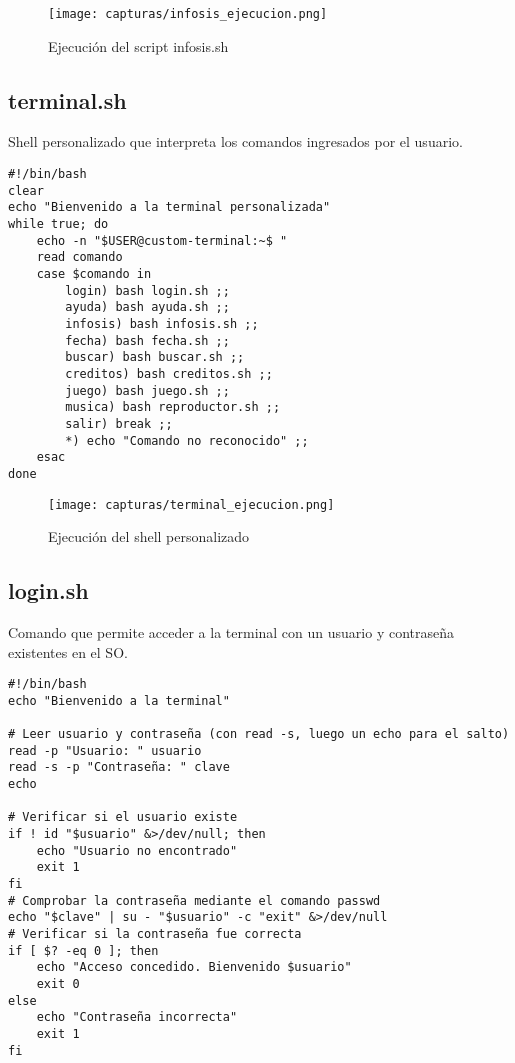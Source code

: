 \documentclass[12pt]{article}
\begin{document}
\begin{figure}[H]
    \centering
    \texttt{[image: capturas/infosis\_ejecucion.png]}
    \caption{Ejecución del script infosis.sh}
\end{figure}

\subsection{terminal.sh}
Shell personalizado que interpreta los comandos ingresados por el usuario.

\begin{lstlisting}[caption={shell.sh}]
#!/bin/bash
clear
echo "Bienvenido a la terminal personalizada"
while true; do
    echo -n "$USER@custom-terminal:~$ "
    read comando
    case $comando in
        login) bash login.sh ;;
        ayuda) bash ayuda.sh ;;
        infosis) bash infosis.sh ;;
        fecha) bash fecha.sh ;;
        buscar) bash buscar.sh ;;
        creditos) bash creditos.sh ;;
        juego) bash juego.sh ;;
        musica) bash reproductor.sh ;;
        salir) break ;;
        *) echo "Comando no reconocido" ;;
    esac
done
\end{lstlisting}

\begin{figure}[H]
    \centering
    \texttt{[image: capturas/terminal\_ejecucion.png]}
    \caption{Ejecución del shell personalizado}
\end{figure}

\subsection{login.sh}
Comando que permite acceder a la terminal con un usuario y contraseña existentes en el SO.

\begin{lstlisting}[caption={login.sh}]
#!/bin/bash
echo "Bienvenido a la terminal"

# Leer usuario y contraseña (con read -s, luego un echo para el salto)
read -p "Usuario: " usuario
read -s -p "Contraseña: " clave
echo

# Verificar si el usuario existe
if ! id "$usuario" &>/dev/null; then
    echo "Usuario no encontrado"
    exit 1
fi
# Comprobar la contraseña mediante el comando passwd
echo "$clave" | su - "$usuario" -c "exit" &>/dev/null
# Verificar si la contraseña fue correcta
if [ $? -eq 0 ]; then
    echo "Acceso concedido. Bienvenido $usuario"
    exit 0
else
    echo "Contraseña incorrecta"
    exit 1
fi
\end{lstlisting}
\end{document}

